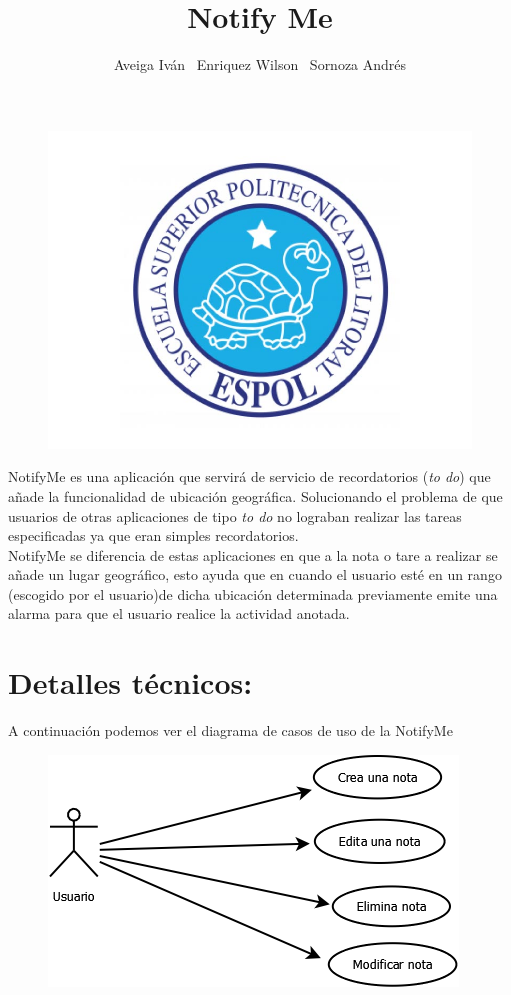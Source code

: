 \documentclass[a4paper,11pt]{article}
\begin{document}
	\author{
	Aveiga Iván \ Enriquez Wilson \ Sornoza Andrés
	}
\title{Notify Me}
\maketitle
\begin{figure}[h]
\centering
\includegraphics[width=0.7\linewidth]{./logo}
\end{figure}

\vspace{7mm}

NotifyMe es una aplicación que servirá de servicio de recordatorios (\emph{to do}) que añade la funcionalidad de ubicación geográfica. Solucionando el problema de que usuarios de otras aplicaciones de tipo \emph{to do} no lograban realizar las tareas especificadas ya que eran simples recordatorios. \\

NotifyMe se diferencia de estas aplicaciones en que a la nota o tare a realizar se añade un lugar geográfico, esto ayuda que en cuando el usuario esté en un rango (escogido por el usuario)de dicha ubicación determinada previamente emite una alarma para que el usuario realice la actividad anotada.

\section{\textbf{Detalles técnicos:}}
A continuación podemos ver el diagrama de casos de uso de la NotifyMe \\
\begin{figure}[h]
\centering
\includegraphics[width=0.7\linewidth]{./CasoDeUso}
\end{figure}
\end{document}
